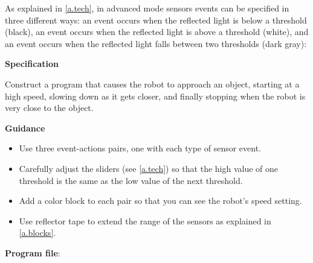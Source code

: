 \label{ch.slow}

As explained in \cref{a.tech}, in advanced mode sensors events can be
specified in three different ways: an event occurs when the reflected
light is below a threshold (black), an event occurs when the reflected
light is above a threshold (white), and an event occurs when the
reflected light falls between two thresholds (dark gray):


\textbf{Specification}

Construct a program that causes the robot to approach an object,
starting at a high speed, slowing down as it gets closer, and finally
stopping when the robot is very close to the object.

\textbf{Guidance}

\begin{itemize}
\item Use three event-actions pairs, one with each type of sensor
event.

\item Carefully adjust the sliders (see \cref{a.tech}) so that the
high value of one threshold is the same as the low value of the next
threshold. 

\item Add a color block to each pair so that you can see the robot's
speed setting.

\item Use reflector tape to extend the range of
the sensors as explained in \cref{a.blocks}. 
\end{itemize}

\bigskip

{\raggedleft \hfill \textbf{Program file}: }
